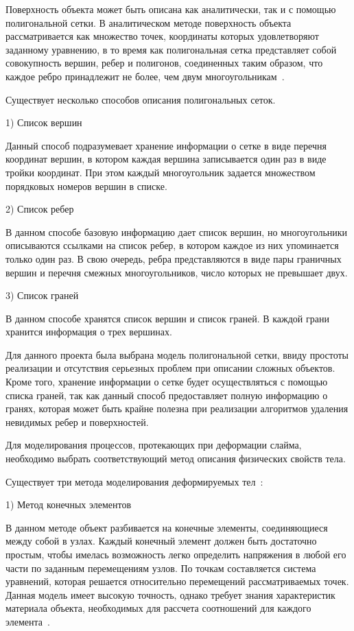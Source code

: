 Поверхность объекта может быть описана как аналитически, так и с помощью полигональной сетки. В аналитическом методе поверхность объекта рассматривается как множество точек, координаты которых удовлетворяют заданному уравнению, в то время как полигональная сетка представляет собой совокупность вершин, ребер и полигонов, соединенных таким образом, что каждое ребро принадлежит не более, чем двум многоугольникам~\cite{bojko}.

Существует несколько способов описания полигональных сеток.

1) Список вершин

Данный способ подразумевает хранение информации о сетке в виде перечня координат вершин, в котором каждая вершина записывается один раз в виде тройки координат. При этом каждый многоугольник задается множеством порядковых номеров вершин в списке.

2) Список ребер

В данном способе базовую информацию дает список вершин, но многоугольники описываются ссылками на список ребер, в котором каждое из них упоминается только один раз. В свою очередь, ребра представляются в виде пары граничных вершин и перечня смежных многоугольников, число которых не превышает двух.

3) Список граней

В данном способе хранятся список вершин и список граней. В каждой грани хранится информация о трех вершинах.

Для данного проекта была выбрана модель полигональной сетки, ввиду простоты реализации и отсутствия серьезных проблем при описании сложных объектов. Кроме того, хранение информации о сетке будет осуществляться с помощью списка граней, так как данный способ предоставляет полную информацию о гранях, которая может быть крайне полезна при реализации алгоритмов удаления невидимых ребер и поверхностей.

Для моделирования процессов, протекающих при деформации слайма, необходимо выбрать соответствующий метод описания физических свойств тела.

Существует три метода моделирования деформируемых тел~\cite{muller}:

1) Метод конечных элементов

В данном методе объект разбивается на конечные элементы, соединяющиеся
между собой в узлах. Каждый конечный элемент должен быть достаточно
простым, чтобы имелась возможность легко определить напряжения в любой его части по заданным перемещениям узлов. По точкам составляется система уравнений, которая решается относительно перемещений рассматриваемых точек. Данная модель имеет высокую точность, однако требует знания характеристик материала объекта, необходимых для рассчета соотношений для каждого элемента~\cite{muller}.

